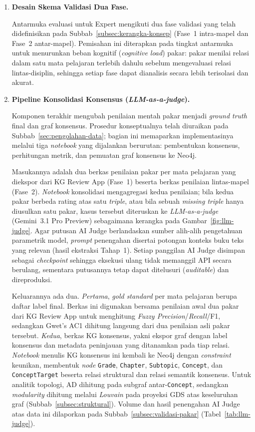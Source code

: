 \documentclass[../../thesis]{subfiles}
\begin{document}
\begin{enumerate}
  \item \textbf{Desain Skema Validasi Dua Fase.}

  Antarmuka evaluasi untuk Expert mengikuti dua fase validasi yang telah
  didefinisikan pada Subbab~\ref{subsec:kerangka-konsep} (Fase~1 intra-mapel dan
  Fase~2 antar-mapel). Pemisahan ini diterapkan pada tingkat antarmuka untuk
  menurunkan beban kognitif (\textit{cognitive load}) pakar: pakar menilai
  relasi dalam satu mata pelajaran terlebih dahulu sebelum mengevaluasi relasi
  lintas-disiplin, sehingga setiap fase dapat dianalisis secara lebih terisolasi
  dan akurat.

  \item \textbf{Pipeline Konsolidasi Konsensus (\textit{LLM-as-a-judge}).}

  Komponen terakhir mengubah penilaian mentah pakar menjadi \textit{ground truth}
  final dan graf konsensus. Prosedur konseptualnya telah diuraikan pada
  Subbab~\ref{sec:pengolahan-data}; bagian ini memaparkan implementasinya
  melalui tiga \textit{notebook} yang dijalankan berurutan: pembentukan
  konsensus, perhitungan metrik, dan pemuatan graf konsensus ke Neo4j.

  Masukannya adalah dua berkas penilaian pakar per mata pelajaran yang diekspor
  dari KG Review App (Fase~1) beserta berkas penilaian lintas-mapel (Fase~2).
  \textit{Notebook} konsolidasi mengagregasi kedua penilaian; bila kedua pakar
  berbeda rating atas satu \textit{triple}, atau bila sebuah \textit{missing
  triple} hanya diusulkan satu pakar, kasus tersebut diteruskan ke
  \textit{LLM-as-a-judge} (Gemini~3.1 Pro Preview) sebagaimana kerangka
  pada Gambar~\ref{fig:llm-judge}. Agar putusan AI Judge berlandaskan sumber
  alih-alih pengetahuan parametrik model, \textit{prompt} penengahan disertai
  potongan konteks buku teks yang relevan (hasil ekstraksi Tahap~1). Setiap
  panggilan AI Judge disimpan sebagai \textit{checkpoint} sehingga eksekusi ulang
  tidak memanggil API secara berulang, sementara putusannya tetap dapat
  ditelusuri (\textit{auditable}) dan direproduksi.

  Keluarannya ada dua. \emph{Pertama}, \textit{gold standard} per mata pelajaran
  berupa daftar label final. Berkas ini digunakan bersama penilaian awal dua pakar
  dari KG Review App untuk menghitung \textit{Fuzzy Precision}/\textit{Recall}/F1,
  sedangkan Gwet's AC1 dihitung langsung dari dua penilaian asli pakar
  tersebut. \emph{Kedua},
  berkas KG konsensus, yakni ekspor graf dengan label konsensus dan metadata
  peninjauan yang ditanamkan pada tiap relasi. \textit{Notebook} 
  menulis KG konsensus ini kembali ke Neo4j dengan \textit{constraint} keunikan,
  membentuk \textit{node} \texttt{Grade}, \texttt{Chapter}, \texttt{Subtopic},
  \texttt{Concept}, dan \texttt{ConceptTarget} beserta relasi struktural dan relasi
  semantik konsensus. Untuk analitik topologi, AD dihitung pada subgraf
  antar-\texttt{Concept}, sedangkan \textit{modularity} dihitung melalui
  \textit{Louvain} pada proyeksi GDS atas keseluruhan graf
  (Subbab~\ref{subsec:struktural}). Volume dan hasil penengahan AI Judge atas
  data ini dilaporkan pada
  Subbab~\ref{subsec:validasi-pakar} (Tabel~\ref{tab:llm-judge}).
\end{enumerate}

\ifSubfilesClassLoaded{\printbibliography[title={Daftar Pustaka}]}{}
\end{document}
